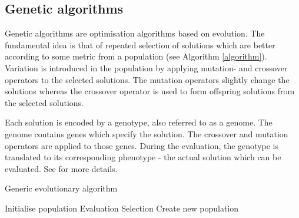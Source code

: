 \subsection{Genetic algorithms}
Genetic algorithms are optimisation algorithms based on evolution. The fundamental idea is that
of repeated selection of solutions which are better according to some metric from a population (see Algorithm \ref{algorithm}).
Variation is introduced in the population by applying mutation- and crossover operators to the
selected solutions. The mutation operators slightly change the solutions whereas the crossover
operator is used to form offspring solutions from the selected solutions.

Each solution is encoded by a genotype, also referred to as a genome. The genome contains
genes which specify the solution. The crossover and mutation operators are applied to those genes.
During the evaluation, the genotype is translated to its corresponding phenotype -
the actual solution which can be evaluated. See \cite{compint} for more details.


\begin{algorithm}[H]
    \caption{Generic evolutionary algorithm}
    \begin{algorithmic}

    \State Initialise population
        \State Evaluation 
        \State Selection  
        \State Create new population 
    \EndWhile
\EndProcedure

\end{algorithmic}
\label{algorithm}
\end{algorithm}
